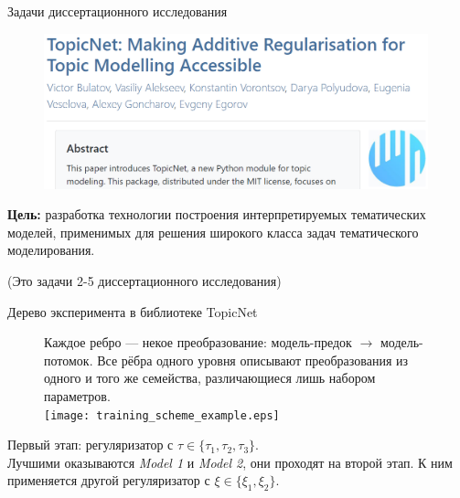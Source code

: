 \begin{frame}[t]{Задачи диссертационного исследования}

\begin{figure}[ht]
    \centering
    \includegraphics[width=0.99\textwidth]{Presentation/images/topicnet_paper.png}
\end{figure} 

\bigskip

\textbf{Цель:} разработка технологии построения интерпретируемых  тематических моделей, применимых для решения широкого класса задач тематического моделирования.

\bigskip
\small{(Это задачи 2-5 диссертационного исследования)}

\end{frame}









\begin{frame}{Дерево эксперимента в библиотеке TopicNet}

\begin{figure}[ht]
\small
Каждое ребро --- некое преобразование: модель-предок $\rightarrow$ модель-потомок. Все рёбра одного
уровня описывают преобразования из одного и того же семейства,
различающиеся лишь набором параметров.\\
    \centering
    \texttt{[image: training\_scheme\_example.eps]}
\end{figure} 
        Первый этап: регуляризатор с $\tau \in \{\tau_1, \tau_2, \tau_3\}$.\\
        Лучшими оказываются \emph{Model 1} и \emph{Model 2}, они проходят на второй этап. К ним применяется другой регуляризатор с $\xi \in \{\xi_1, \xi_2\}$.
\normalsize
\end{frame}

